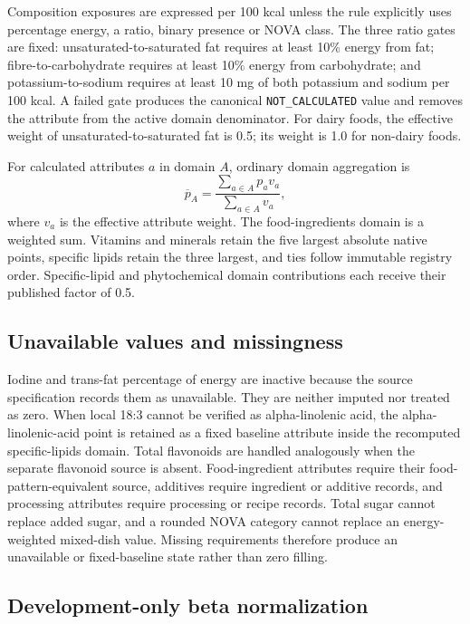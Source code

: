 Composition exposures are expressed per 100 kcal unless the rule explicitly
uses percentage energy, a ratio, binary presence or NOVA class. The three ratio
gates are fixed: unsaturated-to-saturated fat requires at least 10\% energy from
fat; fibre-to-carbohydrate requires at least 10\% energy from carbohydrate; and
potassium-to-sodium requires at least 10 mg of both potassium and sodium per
100 kcal. A failed gate produces the canonical \texttt{NOT\_CALCULATED} value
and removes the attribute from the active domain denominator. For dairy foods,
the effective weight of unsaturated-to-saturated fat is 0.5; its weight is 1.0
for non-dairy foods.

For calculated attributes \(a\) in domain \(A\), ordinary domain aggregation is
\[
\overline p_A=\frac{\sum_{a\in A}p_av_a}{\sum_{a\in A}v_a},
\]
where \(v_a\) is the effective attribute weight. The food-ingredients domain is
a weighted sum. Vitamins and minerals retain the five largest absolute native
points, specific lipids retain the three largest, and ties follow immutable
registry order. Specific-lipid and phytochemical domain contributions each
receive their published factor of 0.5.

\subsection*{Unavailable values and missingness}

Iodine and trans-fat percentage of energy are inactive because the source
specification records them as unavailable. They are neither imputed nor treated
as zero. When local 18:3 cannot be verified as alpha-linolenic acid, the
alpha-linolenic-acid point is retained as a fixed baseline attribute inside the
recomputed specific-lipids domain. Total flavonoids are handled analogously when
the separate flavonoid source is absent. Food-ingredient attributes require
their food-pattern-equivalent source, additives require ingredient or additive
records, and processing attributes require processing or recipe records. Total
sugar cannot replace added sugar, and a rounded NOVA category cannot replace an
energy-weighted mixed-dish value. Missing requirements therefore produce an
unavailable or fixed-baseline state rather than zero filling.

\subsection*{Development-only beta normalization}

